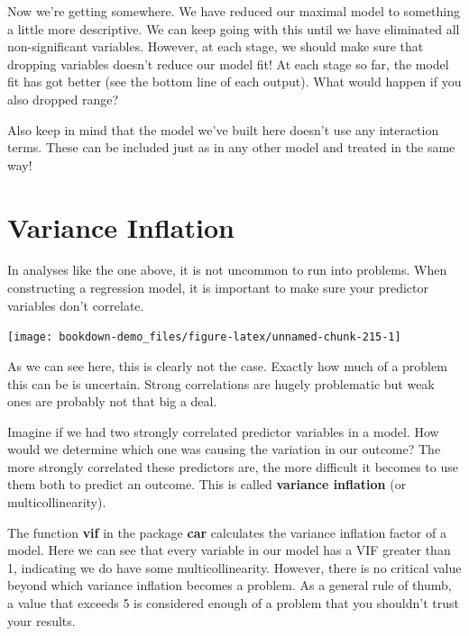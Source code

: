 \documentclass[
]{book}
\begin{document}
Now we're getting somewhere. We have reduced our maximal model to something a little more descriptive. We can keep going with this until we have eliminated all non-significant variables. However, at each stage, we should make sure that dropping variables doesn't reduce our model fit! At each stage so far, the model fit has got better (see the bottom line of each output). What would happen if you also dropped range?

Also keep in mind that the model we've built here doesn't use any interaction terms. These can be included just as in any other model and treated in the same way!

\hypertarget{variance-inflation}{%
\section{Variance Inflation}\label{variance-inflation}}

In analyses like the one above, it is not uncommon to run into problems. When constructing a regression model, it is important to make sure your predictor variables don't correlate.

\begin{center}\texttt{[image: bookdown-demo\_files/figure-latex/unnamed-chunk-215-1]} \end{center}

As we can see here, this is clearly not the case. Exactly how much of a problem this can be is uncertain. Strong correlations are hugely problematic but weak ones are probably not that big a deal.

Imagine if we had two strongly correlated predictor variables in a model. How would we determine which one was causing the variation in our outcome? The more strongly correlated these predictors are, the more difficult it becomes to use them both to predict an outcome. This is called \textbf{variance inflation} (or multicollinearity).

The function \textbf{vif} in the package \textbf{car} \citep{car} calculates the variance inflation factor of a model. Here we can see that every variable in our model has a VIF greater than 1, indicating we do have some multicollinearity. However, there is no critical value beyond which variance inflation becomes a problem. As a general rule of thumb, a value that exceeds 5 is considered enough of a problem that you shouldn't trust your results.
\end{document}

